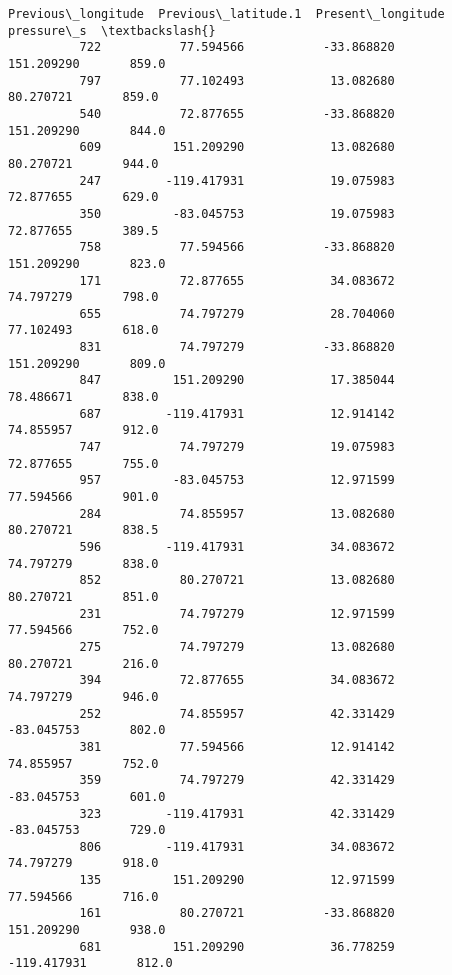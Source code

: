 \documentclass[11pt]{article}
\begin{document}
\begin{Verbatim}[commandchars=\\\{\}]
               Previous\_longitude  Previous\_latitude.1  Present\_longitude  pressure\_s  \textbackslash{}
          722           77.594566           -33.868820         151.209290       859.0   
          797           77.102493            13.082680          80.270721       859.0   
          540           72.877655           -33.868820         151.209290       844.0   
          609          151.209290            13.082680          80.270721       944.0   
          247         -119.417931            19.075983          72.877655       629.0   
          350          -83.045753            19.075983          72.877655       389.5   
          758           77.594566           -33.868820         151.209290       823.0   
          171           72.877655            34.083672          74.797279       798.0   
          655           74.797279            28.704060          77.102493       618.0   
          831           74.797279           -33.868820         151.209290       809.0   
          847          151.209290            17.385044          78.486671       838.0   
          687         -119.417931            12.914142          74.855957       912.0   
          747           74.797279            19.075983          72.877655       755.0   
          957          -83.045753            12.971599          77.594566       901.0   
          284           74.855957            13.082680          80.270721       838.5   
          596         -119.417931            34.083672          74.797279       838.0   
          852           80.270721            13.082680          80.270721       851.0   
          231           74.797279            12.971599          77.594566       752.0   
          275           74.797279            13.082680          80.270721       216.0   
          394           72.877655            34.083672          74.797279       946.0   
          252           74.855957            42.331429         -83.045753       802.0   
          381           77.594566            12.914142          74.855957       752.0   
          359           74.797279            42.331429         -83.045753       601.0   
          323         -119.417931            42.331429         -83.045753       729.0   
          806         -119.417931            34.083672          74.797279       918.0   
          135          151.209290            12.971599          77.594566       716.0   
          161           80.270721           -33.868820         151.209290       938.0   
          681          151.209290            36.778259        -119.417931       812.0   

\end{Verbatim}
\end{document}
